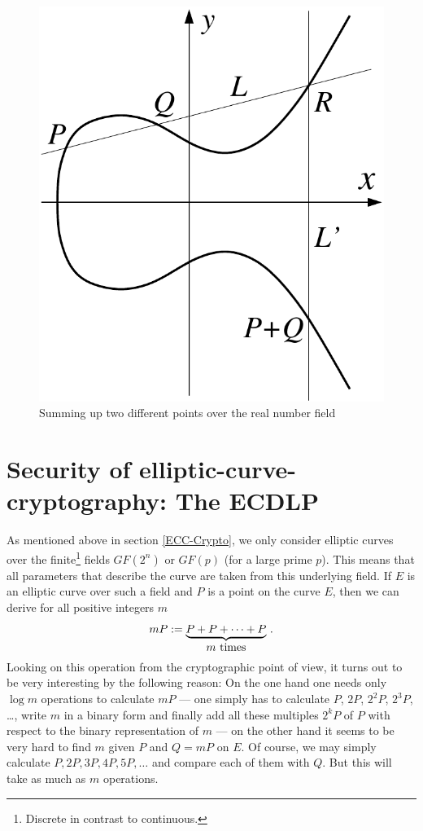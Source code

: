 \begin{figure}[htbp]
\begin{center}
\includegraphics[scale=0.65]{figures/ec-add}
\caption{Summing up two different points over the real number field} %
\end{center}
\end{figure}
\enlargethispage{+20pt}
\newpage


\section{Security of elliptic-curve-cryptography: The ECDLP}

As mentioned above in section \ref{ECC-Crypto}, we only consider elliptic curves over the finite\footnote{Discrete in contrast to continuous.} fields $GF(2^n)$ or $GF(p)$ (for a large prime $p$). This means that all parameters that describe the curve are taken from this underlying field. If $E$ is an elliptic curve over such a field and $P$ is a point on the curve $E$, then we can derive for all positive integers $m$
$$ mP := \underbrace{P+P+\dots+P}_{\hbox{$m$ times}} \, .
$$
Looking on this operation from the cryptographic point of view, it turns out to be very interesting by the following reason: On the one hand one needs only $\log m$ operations to calculate $mP$ --- one simply has to calculate $P$, $2P$, $2^2P$, $2^3P$, \dots, write $m$ in a binary form and finally add all these multiples $2^kP$ of $P$ with respect to the binary representation of $m$ --- on the other hand it seems to be very hard to find $m$ given $P$ and $Q=mP$ on $E$. Of course, we may simply calculate $P,2P,3P,4P,5P,\dots$ and compare each of them with $Q$. But this will take as much as $m$ operations.

